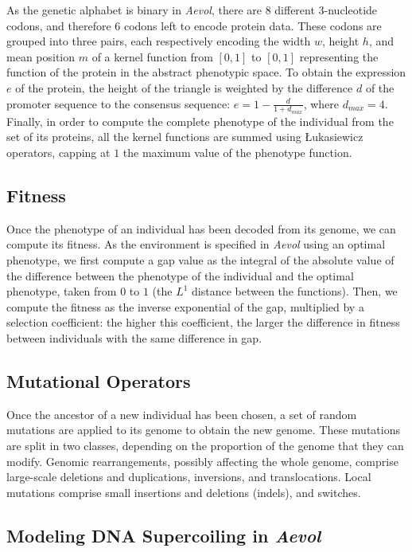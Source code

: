 As the genetic alphabet is binary in \emph{Aevol}, there are 8 different 3-nucleotide codons, and therefore 6 codons left to encode protein data.
These codons are grouped into three pairs, each respectively encoding the width $w$, height $h$, and mean position $m$ of a kernel function from $[0, 1]$ to $[0, 1]$ representing the function of the protein in the abstract phenotypic space.
To obtain the expression $e$ of the protein, the height of the triangle is weighted by the difference $d$ of the promoter sequence to the consensus sequence: $e = 1 - \frac{d}{1+d_{max}}$, where $d_{max} = 4$.
Finally, in order to compute the complete phenotype of the individual from the set of its proteins, all the kernel functions are summed using Łukasiewicz operators, capping at $1$ the maximum value of the phenotype function.

\subsection{Fitness}

Once the phenotype of an individual has been decoded from its genome, we can compute its fitness.
As the environment is specified in \emph{Aevol} using an optimal phenotype, we first compute a gap value as the integral of the absolute value of the difference between the phenotype of the individual and the optimal phenotype, taken from $0$ to $1$ (the $L^1$ distance between the functions).
Then, we compute the fitness as the inverse exponential of the gap, multiplied by a selection coefficient: the higher this coefficient, the larger the difference in fitness between individuals with the same difference in gap.

\subsection{Mutational Operators}

Once the ancestor of a new individual has been chosen, a set of random mutations are applied to its genome to obtain the new genome.
These mutations are split in two classes, depending on the proportion of the genome that they can modify.
Genomic rearrangements, possibly affecting the whole genome, comprise large-scale deletions and duplications, inversions, and translocations.
Local mutations comprise small insertions and deletions (indels), and switches.

\subsection{Modeling DNA Supercoiling in \emph{Aevol}}

